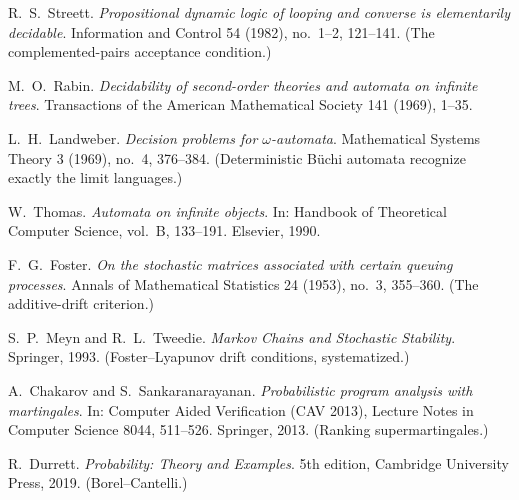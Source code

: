 
R.~S.~Streett.
\emph{Propositional dynamic logic of looping and converse is elementarily
decidable}.
Information and Control 54 (1982), no.~1--2, 121--141. (The
complemented-pairs acceptance condition.)

M.~O.~Rabin.
\emph{Decidability of second-order theories and automata on infinite
trees}.
Transactions of the American Mathematical Society 141 (1969), 1--35.

L.~H.~Landweber.
\emph{Decision problems for $\omega$-automata}.
Mathematical Systems Theory 3 (1969), no.~4, 376--384. (Deterministic
B\"uchi automata recognize exactly the limit languages.)

W.~Thomas.
\emph{Automata on infinite objects}.
In: Handbook of Theoretical Computer Science, vol.~B, 133--191.
Elsevier, 1990.

F.~G.~Foster.
\emph{On the stochastic matrices associated with certain queuing
processes}.
Annals of Mathematical Statistics 24 (1953), no.~3, 355--360. (The
additive-drift criterion.)

S.~P.~Meyn and R.~L.~Tweedie.
\emph{Markov Chains and Stochastic Stability}.
Springer, 1993. (Foster--Lyapunov drift conditions, systematized.)

A.~Chakarov and S.~Sankaranarayanan.
\emph{Probabilistic program analysis with martingales}.
In: Computer Aided Verification (CAV 2013), Lecture Notes in Computer
Science 8044, 511--526. Springer, 2013. (Ranking supermartingales.)

R.~Durrett.
\emph{Probability: Theory and Examples}.
5th edition, Cambridge University Press, 2019. (Borel--Cantelli.)
